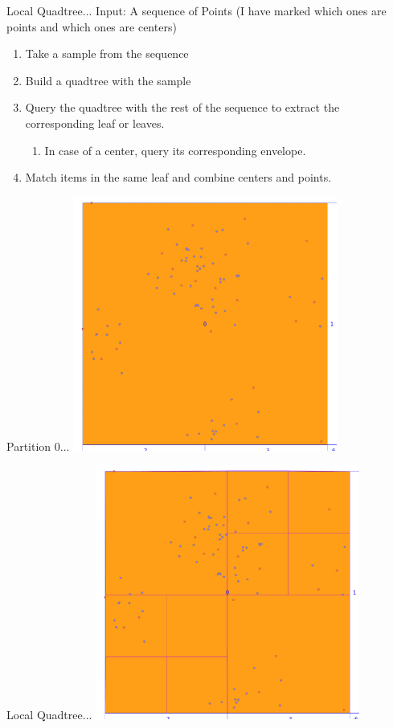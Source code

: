 \documentclass{beamer}
\begin{document}
\begin{frame}{Local Quadtree...}
    Input: A sequence of Points (I have marked which ones are points and which ones are centers)
    \begin{enumerate}
     \item Take a sample from the sequence
     \item Build a quadtree with the sample
     \item Query the quadtree with the rest of the sequence to extract the corresponding leaf or leaves.
        \begin{enumerate}
            \item In case of a center, query its corresponding envelope.
        \end{enumerate}
     \item Match items in the same leaf and combine centers and points.
    \end{enumerate}
\end{frame}
\begin{frame}{Partition 0...}
    \centering
    \includegraphics[width=0.65\textwidth]{figures/05-Partition0}
\end{frame}
\begin{frame}{Local Quadtree...}
    \centering
    \includegraphics[width=0.65\textwidth]{figures/06-LQuadtree}
\end{frame}
\end{document}
